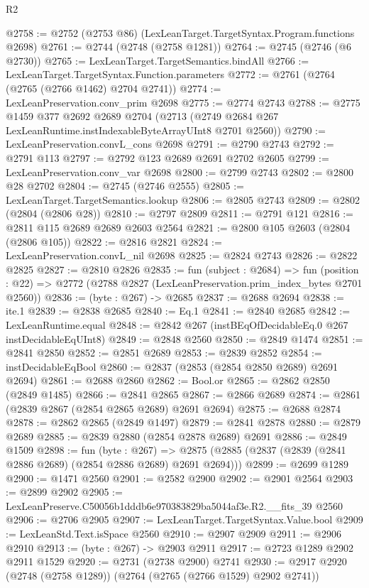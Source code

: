 \begin{lexlean}{R2}
\begin{coremodule}
@2758 := @2752 (@2753 @86) (LexLeanTarget.TargetSyntax.Program.functions @2698)
@2761 := @2744 (@2748 (@2758 @1281))
@2764 := @2745 (@2746 (@6 @2730))
@2765 := LexLeanTarget.TargetSemantics.bindAll
@2766 := LexLeanTarget.TargetSyntax.Function.parameters
@2772 := @2761 (@2764 (@2765 (@2766 @1462) @2704 @2741))
@2774 := LexLeanPreservation.conv_prim @2698
@2775 := @2774 @2743
@2788 := @2775
    @1459
    @377
    @2692
    @2689
    @2704
    (@2713 (@2749 @2684 @267 LexLeanRuntime.instIndexableByteArrayUInt8 @2701 @2560))
@2790 := LexLeanPreservation.convL_cons @2698
@2791 := @2790 @2743
@2792 := @2791 @113
@2797 := @2792 @123 @2689 @2691 @2702 @2605
@2799 := LexLeanPreservation.conv_var @2698
@2800 := @2799 @2743
@2802 := @2800 @28 @2702
@2804 := @2745 (@2746 @2555)
@2805 := LexLeanTarget.TargetSemantics.lookup
@2806 := @2805 @2743
@2809 := @2802 (@2804 (@2806 @28))
@2810 := @2797 @2809
@2811 := @2791 @121
@2816 := @2811 @115 @2689 @2689 @2603 @2564
@2821 := @2800 @105 @2603 (@2804 (@2806 @105))
@2822 := @2816 @2821
@2824 := LexLeanPreservation.convL_nil @2698
@2825 := @2824 @2743
@2826 := @2822 @2825
@2827 := @2810 @2826
@2835 := fun (subject : @2684) =>
  fun (position : @22) => @2772 (@2788 @2827 (LexLeanPreservation.prim_index_bytes @2701 @2560))
@2836 := (byte : @267) -> @2685
@2837 := @2688 @2694
@2838 := ite.{1}
@2839 := @2838 @2685
@2840 := Eq.{1}
@2841 := @2840 @2685
@2842 := LexLeanRuntime.equal
@2848 := @2842 @267 (instBEqOfDecidableEq.{0} @267 instDecidableEqUInt8)
@2849 := @2848 @2560
@2850 := @2849 @1474
@2851 := @2841 @2850
@2852 := @2851 @2689
@2853 := @2839 @2852
@2854 := instDecidableEqBool
@2860 := @2837 (@2853 (@2854 @2850 @2689) @2691 @2694)
@2861 := @2688 @2860
@2862 := Bool.or
@2865 := @2862 @2850 (@2849 @1485)
@2866 := @2841 @2865
@2867 := @2866 @2689
@2874 := @2861 (@2839 @2867 (@2854 @2865 @2689) @2691 @2694)
@2875 := @2688 @2874
@2878 := @2862 @2865 (@2849 @1497)
@2879 := @2841 @2878
@2880 := @2879 @2689
@2885 := @2839 @2880 (@2854 @2878 @2689) @2691
@2886 := @2849 @1509
@2898 := fun (byte : @267) =>
  @2875 (@2885 (@2837 (@2839 (@2841 @2886 @2689) (@2854 @2886 @2689) @2691 @2694)))
@2899 := @2699 @1289
@2900 := @1471 @2560
@2901 := @2582 @2900
@2902 := @2901 @2564
@2903 := @2899 @2902
@2905 := LexLeanPreserve.C50056b1dddb6e970383829ba5044af3e.R2.__fits_39 @2560
@2906 := @2706 @2905
@2907 := LexLeanTarget.TargetSyntax.Value.bool
@2909 := LexLeanStd.Text.isSpace @2560
@2910 := @2907 @2909
@2911 := @2906 @2910
@2913 := (byte : @267) -> @2903 @2911
@2917 := @2723 @1289 @2902 @2911 @1529
@2920 := @2731 (@2738 @2900) @2741
@2930 := @2917 @2920 (@2748 (@2758 @1289)) (@2764 (@2765 (@2766 @1529) @2902 @2741))

\end{coremodule}
\end{lexlean}
